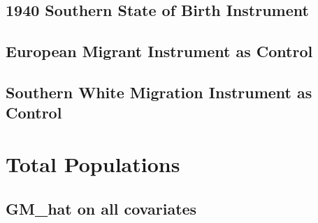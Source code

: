 \documentclass{article}
\begin{document}

\clearpage


\subsection{1940 Southern State of Birth Instrument}



\clearpage




\clearpage


\subsection{European Migrant Instrument as Control}



\clearpage




\clearpage


\subsection{Southern White Migration Instrument as Control}



\clearpage




\clearpage

\section{Total Populations}
\subsection{GM\_hat on all covariates}

\clearpage
\end{document}
